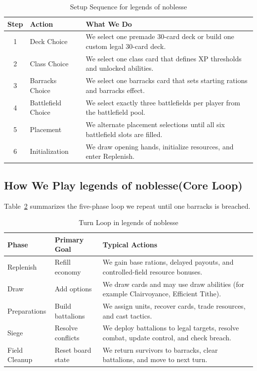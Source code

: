\documentclass[12pt]{article}
\newcommand{\GameName}{legends of noblesse}
\begin{document}
\begin{table}[H]
\centering
\caption{Setup Sequence for \GameName}
\label{tab:setup-sequence}
\begin{tabular}{|c|p{3.2cm}|p{8.3cm}|}
\hline
\textbf{Step} & \textbf{Action} & \textbf{What We Do} \\
\hline
1 & Deck Choice & We select one premade 30-card deck or build one custom legal 30-card deck. \\
\hline
2 & Class Choice & We select one class card that defines XP thresholds and unlocked abilities. \\
\hline
3 & Barracks Choice & We select one barracks card that sets starting rations and barracks effect. \\
\hline
4 & Battlefield Choice & We select exactly three battlefields per player from the battlefield pool. \\
\hline
5 & Placement & We alternate placement selections until all six battlefield slots are filled. \\
\hline
6 & Initialization & We draw opening hands, initialize resources, and enter Replenish. \\
\hline
\end{tabular}
\end{table}

\subsection{How We Play \GameName (Core Loop)}
Table~\ref{tab:phase-loop} summarizes the five-phase loop we repeat until one barracks is breached.

\begin{table}[H]
\centering
\caption{Turn Loop in \GameName}
\label{tab:phase-loop}
\begin{tabular}{|p{2.5cm}|p{3.2cm}|p{7.3cm}|}
\hline
\textbf{Phase} & \textbf{Primary Goal} & \textbf{Typical Actions} \\
\hline
Replenish & Refill economy & We gain base rations, delayed payouts, and controlled-field resource bonuses. \\
\hline
Draw & Add options & We draw cards and may use draw abilities (for example Clairvoyance, Efficient Tithe). \\
\hline
Preparations & Build battalions & We assign units, recover cards, trade resources, and cast tactics. \\
\hline
Siege & Resolve conflicts & We deploy battalions to legal targets, resolve combat, update control, and check breach. \\
\hline
Field Cleanup & Reset board state & We return survivors to barracks, clear battalions, and move to next turn. \\
\hline
\end{tabular}
\end{table}
\end{document}
